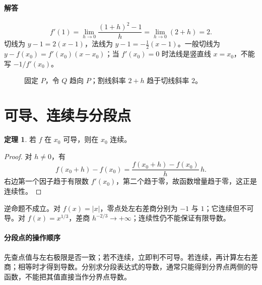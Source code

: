 \documentclass[UTF8,fontset=fandol,12pt,oneside,openany]{ctexrep}
\theoremstyle{definition}
\newtheorem{theorem}{定理}[chapter]
\begin{document}
\paragraph{解答}
\[
 f'(1)=\lim_{h\to0}\frac{(1+h)^2-1}h
       =\lim_{h\to0}(2+h)=2.
\]
切线为 $y-1=2(x-1)$，法线为 $y-1=-\tfrac12(x-1)$。一般切线为 $y-f(x_0)=f'(x_0)(x-x_0)$；当 $f'(x_0)=0$ 时法线是竖直线 $x=x_0$，不能写 $-1/f'(x_0)$。

\begin{figure}[htbp]
\centering
{}
\caption{固定 $P$，令 $Q$ 趋向 $P$；割线斜率 $2+h$ 趋于切线斜率 $2$。}
\end{figure}

\section{可导、连续与分段点}
\label{lec:05:continuity}

\begin{theorem}
若 $f$ 在 $x_0$ 可导，则在 $x_0$ 连续。
\end{theorem}
\begin{proof}
对 $h\ne0$，有
\[
 f(x_0+h)-f(x_0)=\frac{f(x_0+h)-f(x_0)}h\,h.
\]
右边第一个因子趋于有限数 $f'(x_0)$，第二个趋于零，故函数增量趋于零，这正是连续性。
\end{proof}

逆命题不成立。对 $f(x)=|x|$，零点处左右差商分别为 $-1$ 与 $1$；它连续但不可导。对 $f(x)=x^{1/3}$，差商 $h^{-2/3}\to+\infty$；连续性仍不能保证有限导数。

\paragraph{分段点的操作顺序}
先查点值与左右极限是否一致；若不连续，立即判不可导。若连续，再计算左右差商；相等时才得到导数。分别求分段表达式的导数，通常只能得到分界点两侧的导函数，不能把其值直接当作分界点导数。
\end{document}
